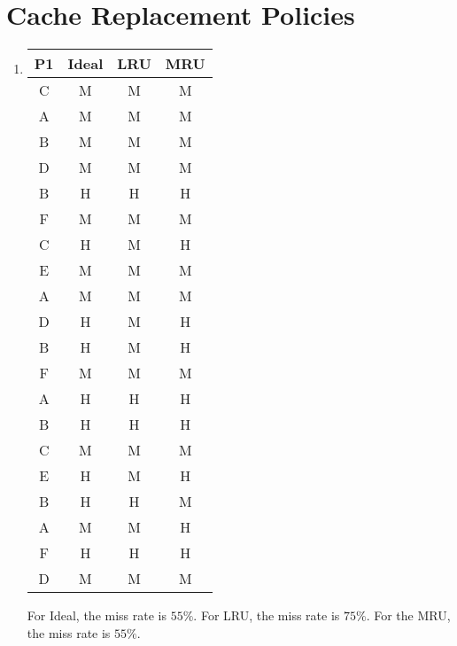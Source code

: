\documentclass{article}
\begin{document}
    \section{Cache Replacement Policies}
    \begin{enumerate}
    \item \begin{tabular}{|c|c|c|c|}
    \hline
    P1 & Ideal & LRU & MRU \\
    \hline
	C & M & M & M \\
    \hline
	A & M & M & M \\
    \hline
	B & M & M & M \\
    \hline
	D & M & M & M \\
    \hline
	B & H & H & H \\
    \hline
	F & M & M & M \\
    \hline
	C & H & M & H \\
    \hline
	E & M & M & M \\
    \hline
	A & M & M & M \\
    \hline
	D & H & M & H \\
    \hline
	B & H & M & H \\
    \hline
	F & M & M & M \\
    \hline
	A & H & H & H \\
    \hline
	B & H & H & H \\
    \hline
	C & M & M & M \\
    \hline
	E & H & M & H \\
    \hline
	B & H & H & M \\
    \hline
	A & M & M & H \\
    \hline
	F & H & H & H \\
    \hline
	D & M & M & M  \\
    \hline
    \end{tabular}
    For Ideal, the miss rate is $55\%$. For LRU, the miss rate is $75\%$. For the MRU, the miss rate is $55\%$.


\end{enumerate}
\end{document}

